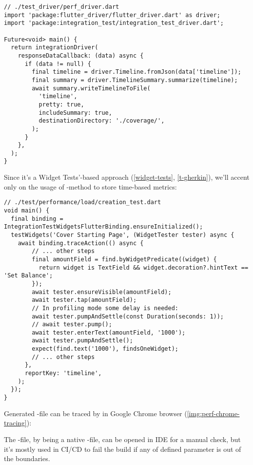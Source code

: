 \begin{lstlisting}
// ./test_driver/perf_driver.dart
import 'package:flutter_driver/flutter_driver.dart' as driver;
import 'package:integration_test/integration_test_driver.dart';

Future<void> main() {
  return integrationDriver(
    responseDataCallback: (data) async {
      if (data != null) {
        final timeline = driver.Timeline.fromJson(data['timeline']);
        final summary = driver.TimelineSummary.summarize(timeline);
        await summary.writeTimelineToFile(
          'timeline',
          pretty: true,
          includeSummary: true,
          destinationDirectory: './coverage/',
        );
      }
    },
  );
}
\end{lstlisting}

\noindent Since it's a Widget Tests'-based approach (\ref{widget-tests}, \ref{t-gherkin}), we'll accent only on the 
usage of -method to store time-based metrics:

\begin{lstlisting}
// ./test/performance/load/creation_test.dart
void main() {
  final binding = IntegrationTestWidgetsFlutterBinding.ensureInitialized();
  testWidgets('Cover Starting Page', (WidgetTester tester) async {
    await binding.traceAction(() async {
        // ... other steps
        final amountField = find.byWidgetPredicate((widget) {
          return widget is TextField && widget.decoration?.hintText == 'Set Balance';
        });
        await tester.ensureVisible(amountField);
        await tester.tap(amountField);
        // In profiling mode some delay is needed:
        await tester.pumpAndSettle(const Duration(seconds: 1));
        // await tester.pump();
        await tester.enterText(amountField, '1000');
        await tester.pumpAndSettle();
        expect(find.text('1000'), findsOneWidget);
        // ... other steps
      },
      reportKey: 'timeline',
    );
  });
}
\end{lstlisting}

\noindent Generated -file can be traced by  in Google Chrome browser 
(\cref{img:perf-chrome-tracing}):


\noindent The -file, by being a native -file, can be opened in IDE for a 
manual check, but it's mostly used in CI/CD to fail the build if any of defined parameter is out of the boundaries. 

